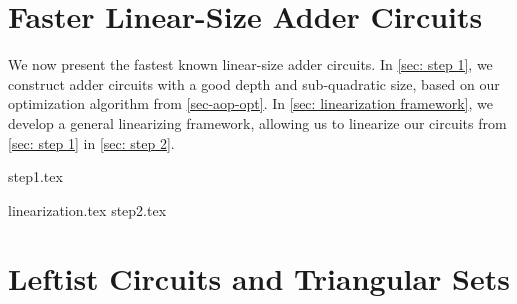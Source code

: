 \begin{abstract}
We consider the fundamental problem of
constructing fast and small circuits for binary addition.
We propose a new algorithm with running time $\mathcal O(n \log_2 n)$
for constructing linear-size $n$-bit adder circuits with a
significantly better depth guarantee compared to previous approaches:
Our circuits have a depth of at most
$\log_2 n + \log_2 \log_2 n + \log_2 \log_2 \log_2 n + \const$,
improving upon the previously best circuits by \citet{HSAdders}
with a depth of at most
$\log_2 n + 8 \sqrt{\log_2 n} + 6 \log_2 \log_2 n + \const$.
Hence,
we decrease the gap to the lower bound
of $\log_2 n + \log_2 \log_2 n + \const$ by \citet{Commentz-Walter-mon}
significantly
from $\mathcal O \Bkt{\sqrt{\log_2 n}}$
to $\mathcal O(\log_2 \log_2 \log_2 n)$.

Our core routine is a new algorithm
for the construction of a circuit for a single carry bit,
or, more generally, for an \aop{},
i.e., a Boolean function of type
$t_0 \lor \bkt{ t_1 \land \bkt{t_2 \lor \bkt{ \dots t_{m-1}} \dots }}$.
We compute linear-size \aop{} circuits
with a depth of at most $\log_2 m + \log_2 \log_2 m + 0.65$
in time $\mathcal O(m \log_2 m)$.
These are the first \aop{} circuits known that, up to an additive constant,
match the lower bound by \citet{Commentz-Walter-mon}
and at the same time have a linear size.
The previously fastest \aop{} circuits 
are only by an additive constant worse in depth,
but have a much higher size in the order of $\mathcal O (m \log_2 m)$.
\end{abstract}

\section{Faster Linear-Size Adder Circuits} \label{sec-adder}

We now present the fastest known linear-size adder circuits.
In \cref{sec: step 1}, we construct adder circuits
with a good depth and sub-quadratic size,
based on our \aop{} optimization algorithm from \cref{sec-aop-opt}.
In \cref{sec: linearization framework},
we develop a general linearizing framework,
allowing us to linearize our circuits from \cref{sec: step 1}
in \cref{sec: step 2}.

{step1.tex}

{linearization.tex}
{step2.tex}


\section{Leftist Circuits and Triangular Sets} \label{sec-sym-share}

